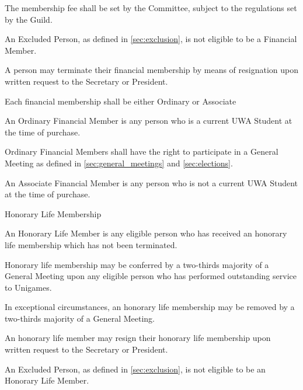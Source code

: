 \documentclass[a4paper]{article}
\begin{document}
\begin{myEnumerate}
\begin{myEnumerate}
\begin{myEnumerate}
                    \item The membership fee shall be set by the Committee, subject to the regulations set by the Guild.
                    \item An Excluded Person, as defined in \cref{sec:exclusion}, is not eligible to be a Financial Member.
                    \item A person may terminate their financial membership by means of resignation upon written request to the Secretary or President.
                    \item Each financial membership shall be either Ordinary or Associate
                        \begin{myEnumerate}
                            \item An Ordinary Financial Member is any person who is a current UWA Student at the time of purchase.
                                \begin{myEnumerate}
                                    \item Ordinary Financial Members shall have the right to participate in a General Meeting as defined in \cref{sec:general_meetings} and \cref{sec:elections}.
                                \end{myEnumerate}
                            \item An Associate Financial Member is any person who is not a current UWA Student at the time of purchase.
                        \end{myEnumerate}
                \end{myEnumerate}
        \end{myEnumerate}
    \item Honorary Life Membership
        \begin{myEnumerate}
            \item An Honorary Life Member is any eligible person who has received an honorary life membership which has not been terminated.
                \begin{myEnumerate}
                    \item Honorary life membership may be conferred by a two-thirds majority of a General Meeting upon any eligible person who has performed outstanding service to Unigames.
                    \item In exceptional circumstances, an honorary life membership may be removed by a two-thirds majority of a General Meeting.
                    \item An honorary life member may resign their honorary life membership upon written request to the Secretary or President.
                    \item An Excluded Person, as defined in \cref{sec:exclusion}, is not eligible to be an Honorary Life Member.
                \end{myEnumerate}
        \end{myEnumerate}
\end{myEnumerate}
\end{document}

